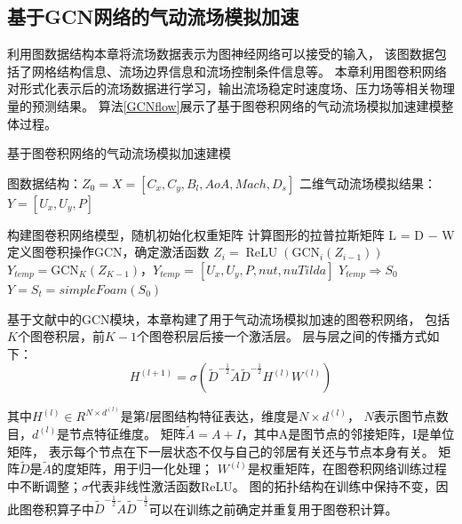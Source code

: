 \subsection{基于GCN网络的气动流场模拟加速}

利用图数据结构本章将流场数据表示为图神经网络可以接受的输入，
该图数据包括了网格结构信息、流场边界信息和流场控制条件信息等。
本章利用图卷积网络对形式化表示后的流场数据进行学习，输出流场稳定时速度场、压力场等相关物理量的预测结果。
算法\ref{GCNflow}展示了基于图卷积网络的气动流场模拟加速建模整体过程。

\renewcommand{\algorithmicrequire}{\textbf{输入：}}
\renewcommand{\algorithmicensure}{\textbf{输出：}}
\begin{algorithm}[htbp]
	\caption{基于图卷积网络的气动流场模拟加速建模}
	\label{GCNflow}
	\begin{algorithmic}[1]
		\REQUIRE 图数据结构：$Z_{0} = X = [C_x, C_y, B_l, AoA, Mach, D_s]$ 
		\ENSURE  二维气动流场模拟结果：$Y = [ U_x,U_y, P]$
		
		\STATE 构建图卷积网络模型，随机初始化权重矩阵
		\STATE 计算图形的拉普拉斯矩阵 L = D − W
		\STATE 定义图卷积操作GCN，确定激活函数
		\STATE $Z_{i} = \operatorname{ReLU}\left(\mathrm{GCN}_{i}\left(Z_{i-1}\right)\right) $
		\ENDFOR
		\STATE $Y_{temp} = \mathrm{GCN}_{K}\left(Z_{K-1}\right)$，$Y_{temp}$ = $[ U_x,U_y, P, nut, nuTilda]$
		\STATE $Y_{temp} \Rightarrow S_0$ 
		\STATE $Y = S_t = simpleFoam(S_0)$  
	\end{algorithmic}
\end{algorithm}

基于文献\cite{2016Semi}中的GCN模块，本章构建了用于气动流场模拟加速的图卷积网络，
包括$K$个图卷积层，前$K-1$个图卷积层后接一个激活层。
层与层之间的传播方式如下：
\begin{equation}
H^{(l+1)}=\sigma\left(\tilde{D}^{-\frac{1}{2}} \tilde{A} \tilde{D}^{-\frac{1}{2}} H^{(l)} W^{(l)}\right)
\end{equation}

\noindent 其中$H^{(l)} \in R^{N \times d^{(l)}}$是第$l$层图结构特征表达，维度是$N \times d^{(l)}$，
$N$表示图节点数目，$d^{(l)}$是节点特征维度。
矩阵$\tilde{A} = A + I$，其中A是图节点的邻接矩阵，I是单位矩阵，
表示每个节点在下一层状态不仅与自己的邻居有关还与节点本身有关。
矩阵$\tilde{D}$是$\tilde{A}$的度矩阵，用于归一化处理；
$W^{(l)}$是权重矩阵，在图卷积网络训练过程中不断调整；$\sigma$代表非线性激活函数ReLU。
图的拓扑结构在训练中保持不变，因此图卷积算子中$\tilde{D}^{-\frac{1}{2}} \tilde{A} \tilde{D}^{-\frac{1}{2}}$可以在训练之前确定并重复用于图卷积计算。


